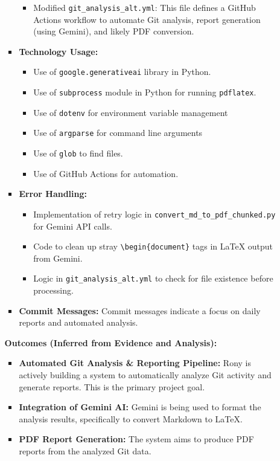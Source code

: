 \documentclass{article}
\begin{document}
\begin{itemize}
\begin{itemize}
\begin{itemize}
\begin{itemize}
        \item Modified \texttt{git\_analysis\_alt.yml}: This file defines a GitHub Actions workflow to automate Git analysis, report generation (using Gemini), and likely PDF conversion.
    \end{itemize}
    \item \textbf{Technology Usage:}
    \begin{itemize}
        \item Use of \texttt{google.generativeai} library in Python.
        \item Use of \texttt{subprocess} module in Python for running \texttt{pdflatex}.
        \item Use of \texttt{dotenv} for environment variable management
        \item Use of \texttt{argparse} for command line arguments
        \item Use of \texttt{glob} to find files.
        \item Use of GitHub Actions for automation.
    \end{itemize}
    \item \textbf{Error Handling:}
    \begin{itemize}
        \item Implementation of retry logic in \texttt{convert\_md\_to\_pdf\_chunked.py} for Gemini API calls.
        \item Code to clean up stray \texttt{\textbackslash begin\{document\}} tags in LaTeX output from Gemini.
        \item Logic in \texttt{git\_analysis\_alt.yml} to check for file existence before processing.
    \end{itemize}
    \item \textbf{Commit Messages:} Commit messages indicate a focus on daily reports and automated analysis.
\end{itemize}
\textbf{Outcomes (Inferred from Evidence and Analysis):}
\begin{itemize}
    \item \textbf{Automated Git Analysis \& Reporting Pipeline:} Rony is actively building a system to automatically analyze Git activity and generate reports. This is the primary project goal.
    \item \textbf{Integration of Gemini AI:} Gemini is being used to format the analysis results, specifically to convert Markdown to LaTeX.
    \item \textbf{PDF Report Generation:} The system aims to produce PDF reports from the analyzed Git data.

\end{itemize}
\end{itemize}
\end{itemize}
\end{document}
